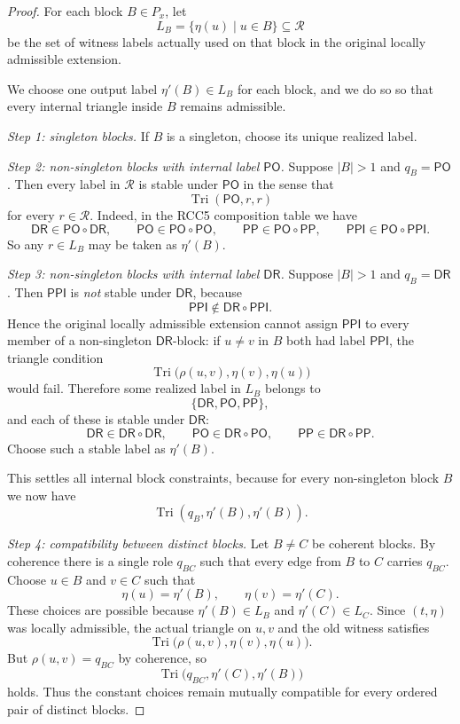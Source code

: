 \documentclass[11pt]{article}
\theoremstyle{definition}
\newcommand{\Roles}{\mathcal{R}}
\newcommand{\DR}{\mathsf{DR}}
\newcommand{\PO}{\mathsf{PO}}
\newcommand{\PP}{\mathsf{PP}}
\newcommand{\PPI}{\mathsf{PPI}}
\newcommand{\Tri}{\operatorname{Tri}}
\begin{document}
\begin{proof}
For each block $B\in P_x$, let
\[
L_B=\{\eta(u)\mid u\in B\}\subseteq \Roles
\]
be the set of witness labels actually used on that block in the original locally admissible extension.

We choose one output label $\eta'(B)\in L_B$ for each block, and we do so so that every internal triangle inside $B$ remains admissible.

\emph{Step 1: singleton blocks.}
If $B$ is a singleton, choose its unique realized label.

\emph{Step 2: non-singleton blocks with internal label $\PO$.}
Suppose $|B|>1$ and $q_B=\PO$. Then every label in $\Roles$ is stable under $\PO$ in the sense that
\[
\Tri(\PO,r,r)
\]
for every $r\in\Roles$.
Indeed, in the RCC5 composition table we have
\[
\DR\in \PO\circ\DR,
\qquad
\PO\in \PO\circ\PO,
\qquad
\PP\in \PO\circ\PP,
\qquad
\PPI\in \PO\circ\PPI.
\]
So any $r\in L_B$ may be taken as $\eta'(B)$.

\emph{Step 3: non-singleton blocks with internal label $\DR$.}
Suppose $|B|>1$ and $q_B=\DR$. Then $\PPI$ is \emph{not} stable under $\DR$, because
\[
\PPI\notin \DR\circ\PPI.
\]
Hence the original locally admissible extension cannot assign $\PPI$ to every member of a non-singleton $\DR$-block: if $u\neq v$ in $B$ both had label $\PPI$, the triangle condition
\[
\Tri\bigl(\rho(u,v),\eta(v),\eta(u)\bigr)
\]
would fail.
Therefore some realized label in $L_B$ belongs to
\[
\{\DR,\PO,\PP\},
\]
and each of these is stable under $\DR$:
\[
\DR\in \DR\circ\DR,
\qquad
\PO\in \DR\circ\PO,
\qquad
\PP\in \DR\circ\PP.
\]
Choose such a stable label as $\eta'(B)$.

This settles all internal block constraints, because for every non-singleton block $B$ we now have
\[
\Tri(q_B,\eta'(B),\eta'(B)).
\]

\emph{Step 4: compatibility between distinct blocks.}
Let $B\neq C$ be coherent blocks. By coherence there is a single role $q_{BC}$ such that every edge from $B$ to $C$ carries $q_{BC}$. Choose $u\in B$ and $v\in C$ such that
\[
\eta(u)=\eta'(B),
\qquad
\eta(v)=\eta'(C).
\]
These choices are possible because $\eta'(B)\in L_B$ and $\eta'(C)\in L_C$. Since $(t,\eta)$ was locally admissible, the actual triangle on $u,v$ and the old witness satisfies
\[
\Tri\bigl(\rho(u,v),\eta(v),\eta(u)\bigr).
\]
But $\rho(u,v)=q_{BC}$ by coherence, so
\[
\Tri\bigl(q_{BC},\eta'(C),\eta'(B)\bigr)
\]
holds. Thus the constant choices remain mutually compatible for every ordered pair of distinct blocks.


\end{proof}
\end{document}
